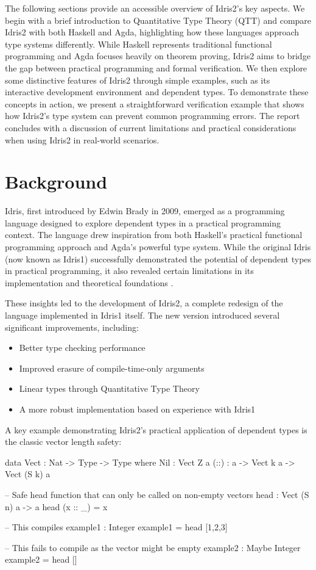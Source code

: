 \documentclass[]{rptuseminar}
\begin{document}
The following sections provide an accessible overview of Idris2's key aspects.
We begin with a brief introduction to Quantitative Type Theory (QTT) and compare Idris2 with both Haskell and Agda, highlighting how these languages approach type systems differently.
While Haskell represents traditional functional programming and Agda focuses heavily on theorem proving, Idris2 aims to bridge the gap between practical programming and formal verification.
We then explore some distinctive features of Idris2 through simple examples, such as its interactive development environment and dependent types.
To demonstrate these concepts in action, we present a straightforward verification example that shows how Idris2's type system can prevent common programming errors.
The report concludes with a discussion of current limitations and practical considerations when using Idris2 in real-world scenarios.

\section{Background}  
\label{sec:background}  
Idris, first introduced by Edwin Brady in 2009, emerged as a programming language designed to explore dependent types in a practical programming context.  
The language drew inspiration from both Haskell's practical functional programming approach and Agda's powerful type system.  
While the original Idris (now known as Idris1) successfully demonstrated the potential of dependent types in practical programming, it also revealed certain limitations in its implementation and theoretical foundations \cite{brady2013idris}.  

These insights led to the development of Idris2, a complete redesign of the language implemented in Idris1 itself.  
The new version introduced several significant improvements, including:  
\begin{itemize}  
    \item Better type checking performance  
    \item Improved erasure of compile-time-only arguments  
    \item Linear types through Quantitative Type Theory  
    \item A more robust implementation based on experience with Idris1  
\end{itemize}  

A key example demonstrating Idris2's practical application of dependent types is the classic vector length safety:  
\begin{idris}  
data Vect : Nat -> Type -> Type where  
    Nil  : Vect Z a  
    (::) : a -> Vect k a -> Vect (S k) a  

-- Safe head function that can only be called on non-empty vectors  
head : Vect (S n) a -> a  
head (x :: _) = x  

-- This compiles  
example1 : Integer  
example1 = head [1,2,3]  

-- This fails to compile as the vector might be empty  
example2 : Maybe Integer  
example2 = head []  
\end{idris}  
\end{document}
